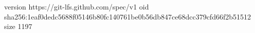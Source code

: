 version https://git-lfs.github.com/spec/v1
oid sha256:1eaf0dedc5688f05146b80fc140761be0b56db847ce68dcc379cfd66f2b51512
size 1197
